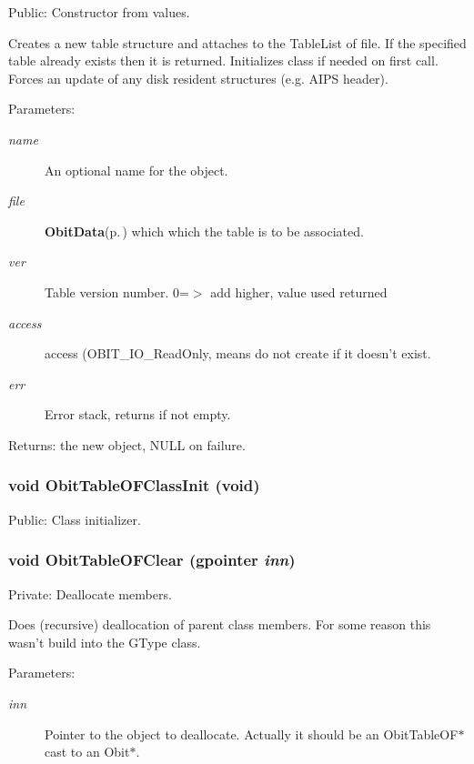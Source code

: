 Public: Constructor from values. 

Creates a new table structure and attaches to the Table\-List of file. If the specified table already exists then it is returned. Initializes class if needed on first call. Forces an update of any disk resident structures (e.g. AIPS header). \begin{Desc}
\item[Parameters:]
\begin{description}
\item[{\em name}]An optional name for the object. \item[{\em file}]{\bf Obit\-Data}{\rm (p.\,\pageref{structObitData})} which which the table is to be associated. \item[{\em ver}]Table version number. 0=$>$ add higher, value used returned \item[{\em access}]access (OBIT\_\-IO\_\-Read\-Only, means do not create if it doesn't exist. \item[{\em err}]Error stack, returns if not empty. \end{description}
\end{Desc}
\begin{Desc}
\item[Returns:]the new object, NULL on failure. \end{Desc}
\subsubsection{\setlength{\rightskip}{0pt plus 5cm}void Obit\-Table\-OFClass\-Init (void)}\label{ObitTableOF_8c_a27}


Public: Class initializer. 

\subsubsection{\setlength{\rightskip}{0pt plus 5cm}void Obit\-Table\-OFClear (gpointer {\em inn})}\label{ObitTableOF_8c_a9}


Private: Deallocate members. 

Does (recursive) deallocation of parent class members. For some reason this wasn't build into the GType class. \begin{Desc}
\item[Parameters:]
\begin{description}
\item[{\em inn}]Pointer to the object to deallocate. Actually it should be an Obit\-Table\-OF$\ast$ cast to an Obit$\ast$. \end{description}
\end{Desc}
